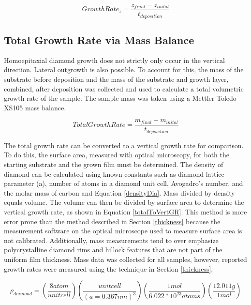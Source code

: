 \begin{equation}
\label{vertGR}
    Growth Rate_z = \frac{z_{final} - z_{inital}}{t_{deposition}}
\end{equation}

\subsection{Total Growth Rate via Mass Balance}
\label{mass}
\indent

Homoepitaxial diamond growth does not strictly only occur in the vertical direction. Lateral outgrowth is also possible. To account for this, the mass of the substrate before deposition and the mass of the substrate and growth layer, combined, after deposition was collected and used to calculate a total volumetric growth rate of the sample. The sample mass was taken using a Mettler Toledo XS105 mass balance. 

\begin{equation}
\label{vertGR}
    Total Growth Rate = \frac{m_{final} - m_{inital}}{t_{deposition}}
\end{equation}

The total growth rate can be converted to a vertical growth rate for comparison. To do this, the surface area, measured with optical microscopy, for both the starting substrate and the grown film must be determined. The density of diamond can be calculated using known constants such as diamond lattice parameter (a), number of atoms in a diamond unit cell, Avogadro's number, and the molar mass of carbon and Equation \ref{densityDia}. Mass divided by density equals volume. The volume can then be divided by surface area to determine the vertical growth rate, as shown in Equation \ref{totalToVertGR}. This method is more error prone than the method described in Section \ref{thickness} because the measurement software on the optical microscope used to measure surface area is not calibrated. Additionally, mass measurements tend to over emphasize polycrystalline diamond rims and hillock features that are not part of the uniform film thickness. Mass data was collected for all samples, however, reported growth rates were measured using the technique in Section \ref{thickness}.

\begin{equation}
\label{densityDia}
    \rho_{diamond} = (\frac{8 atom}{unit cell})(\frac{unit cell}{(a= 0.367 nm)^3})(\frac{1 mol}{6.022 * 10^{23} atoms})(\frac{12.011 g}{1 mol})
\end{equation}

